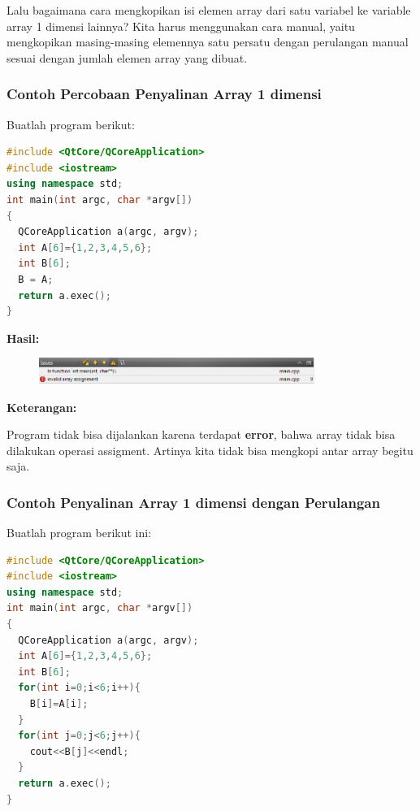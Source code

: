 Lalu bagaimana cara mengkopikan isi elemen array dari satu variabel ke
variable array 1 dimensi lainnya? Kita harus menggunakan cara manual,
yaitu mengkopikan masing-masing elemennya satu persatu dengan perulangan
manual sesuai dengan jumlah elemen array yang dibuat.

\subsubsection*{Contoh  Percobaan Penyalinan Array 1 dimensi}

Buatlah program berikut:

\begin{lstlisting}[language=c++, caption=Percobaan Penyalinan Array 1 dimensi, label=contoh3-8]
#include <QtCore/QCoreApplication>
#include <iostream>
using namespace std;
int main(int argc, char *argv[])
{
  QCoreApplication a(argc, argv);
  int A[6]={1,2,3,4,5,6};
  int B[6];
  B = A;
  return a.exec();
}
\end{lstlisting}

\textbf{Hasil:}

\begin{figure}[htbp]
\centering
\includegraphics[width=0.8\textwidth]{../manuscript/images/capture3-8.PNG}

\end{figure}

\textbf{Keterangan:}

Program tidak bisa dijalankan karena terdapat \textbf{error}, bahwa
array tidak bisa dilakukan operasi assigment. Artinya kita tidak bisa
mengkopi antar array begitu saja.

\subsubsection*{Contoh  Penyalinan Array 1 dimensi dengan Perulangan}

Buatlah program berikut ini:

\begin{lstlisting}[language=c++, caption=Penyalinan Array 1 dimensi dengan Perulangan, label=contoh3-9]
#include <QtCore/QCoreApplication>
#include <iostream>
using namespace std;
int main(int argc, char *argv[])
{
  QCoreApplication a(argc, argv);
  int A[6]={1,2,3,4,5,6};
  int B[6];
  for(int i=0;i<6;i++){
    B[i]=A[i];
  }
  for(int j=0;j<6;j++){
    cout<<B[j]<<endl;
  }
  return a.exec();
}
\end{lstlisting}


